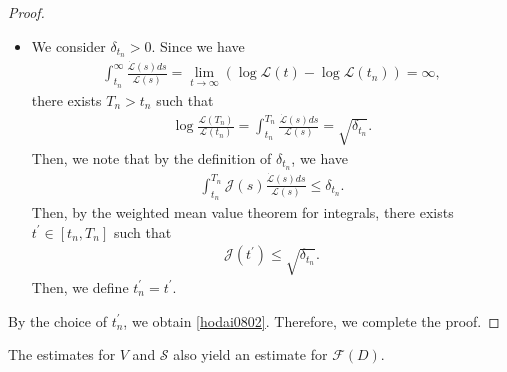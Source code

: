 \documentclass[reqno]{amsart}
\theoremstyle{plain}
\theoremstyle{definition}
\numberwithin{equation}{section}
\begin{document}
\begin{proof}
\begin{itemize}
\item We consider $\delta_{t_n}>0$. Since we have
\begin{align*}
\int_{t_n}^{\infty}\frac{\dot{\mathcal{L}}(s)ds}{\mathcal{L}(s)}=\lim_{t\to\infty}\left(\log{\mathcal{L}}(t)-\log{\mathcal{L}(t_n)}\right)=\infty,
\end{align*}
there exists $T_n>t_n$ such that 
\begin{align*}
\log{\frac{\mathcal{L}(T_n)}{\mathcal{L}(t_n)}}=\int_{t_n}^{T_n}\frac{\dot{\mathcal{L}}(s)ds}{\mathcal{L}(s)}=\sqrt{\delta_{t_n}}.
\end{align*}
Then, we note that by the definition of $\delta_{t_n}$, we have
\begin{align*}
\int_{t_n}^{T_n}\mathcal{J}(s)\frac{\dot{\mathcal{L}}(s)ds}{\mathcal{L}(s)}\leq \delta_{t_n}.
\end{align*}
Then, by the weighted mean value theorem for integrals, there exists $t^{\prime}\in [t_n,T_n]$ such that 
\begin{align*}
\mathcal{J}(t^{\prime})\leq \sqrt{\delta_{t_n}}.
\end{align*}
Then, we define $t_n^{\prime}=t^{\prime}$.
\end{itemize}
By the choice of $t_n^{\prime}$, we obtain \eqref{hodai0802}. Therefore, we complete the proof.
\end{proof}

The estimates for $V$ and $\mathcal{S}$ also yield an estimate for $\mathcal{F}(D)$.
\end{document}

